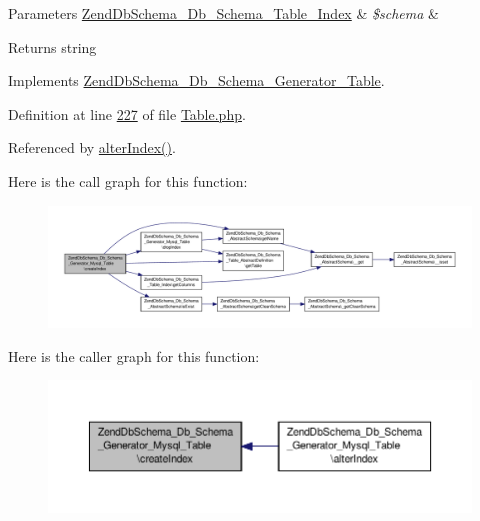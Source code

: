 \begin{DoxyParams}[1]{Parameters}
\hyperlink{classZendDbSchema__Db__Schema__Table__Index}{Zend\-Db\-Schema\-\_\-\-Db\-\_\-\-Schema\-\_\-\-Table\-\_\-\-Index} & {\em \$schema} & \\
\hline
\end{DoxyParams}
\begin{DoxyReturn}{Returns}
string 
\end{DoxyReturn}


Implements \hyperlink{interfaceZendDbSchema__Db__Schema__Generator__Table_acad164cd541d97cad5c8efad5cc391e5}{Zend\-Db\-Schema\-\_\-\-Db\-\_\-\-Schema\-\_\-\-Generator\-\_\-\-Table}.



Definition at line \hyperlink{Generator_2Mysql_2Table_8php_source_l00227}{227} of file \hyperlink{Generator_2Mysql_2Table_8php_source}{Table.\-php}.



Referenced by \hyperlink{Generator_2Mysql_2Table_8php_source_l00253}{alter\-Index()}.



Here is the call graph for this function\-:\nopagebreak
\begin{figure}[H]
\begin{center}
\leavevmode
\includegraphics[width=350pt]{classZendDbSchema__Db__Schema__Generator__Mysql__Table_ab62df69dc345afb27186d6eecc66e753_cgraph}
\end{center}
\end{figure}




Here is the caller graph for this function\-:\nopagebreak
\begin{figure}[H]
\begin{center}
\leavevmode
\includegraphics[width=350pt]{classZendDbSchema__Db__Schema__Generator__Mysql__Table_ab62df69dc345afb27186d6eecc66e753_icgraph}
\end{center}
\end{figure}


